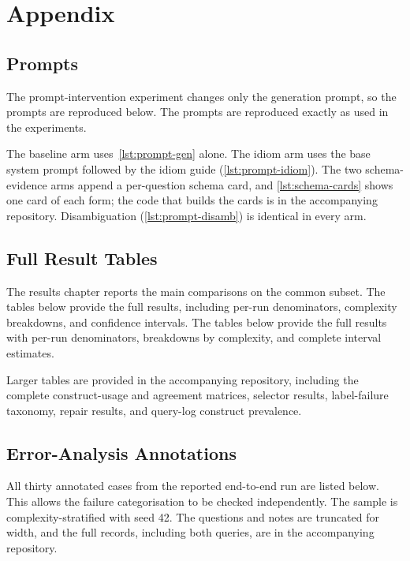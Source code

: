 \chapter{Appendix}
\label{ch:appendix}

\section{Prompts}
\label{app:prompts}

The prompt-intervention experiment changes only the generation prompt, so the prompts are reproduced below.
The prompts are reproduced exactly as used in the experiments.

The baseline arm uses~\cref{lst:prompt-gen} alone.
The idiom arm uses the base system prompt followed by the idiom guide (\cref{lst:prompt-idiom}).
The two schema-evidence arms append a per-question schema card, and \cref{lst:schema-cards} shows one card of each form; the code that builds the cards is in the accompanying repository.
Disambiguation (\cref{lst:prompt-disamb}) is identical in every arm.






\section{Full Result Tables}
\label{app:tables}

The results chapter reports the main comparisons on the common subset. The tables below provide the full results, including per-run denominators, complexity breakdowns, and confidence intervals.
The tables below provide the full results with per-run denominators, breakdowns by complexity, and complete interval estimates.





Larger tables are provided in the accompanying repository, including the complete construct-usage and agreement matrices, selector results, label-failure taxonomy, repair results, and query-log construct prevalence.

\section{Error-Analysis Annotations}
\label{app:annotations}

All thirty annotated cases from the reported end-to-end run are listed below. This allows the failure categorisation to be checked independently.
The sample is complexity-stratified with seed 42.
The questions and notes are truncated for width, and the full records, including both queries, are in the accompanying repository.

